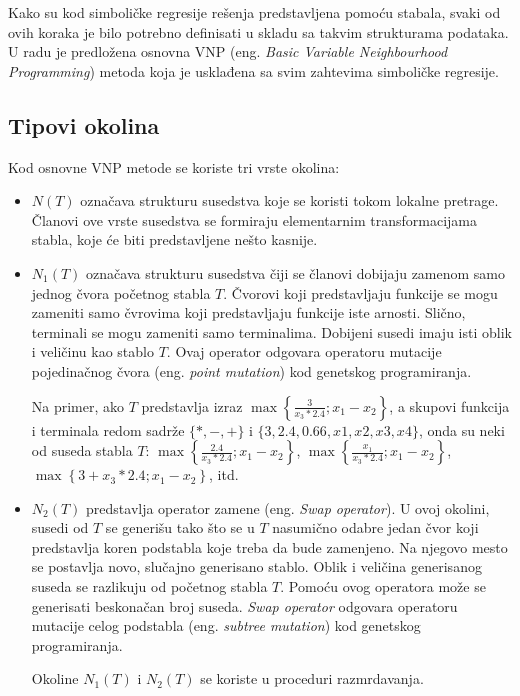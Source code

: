 \documentclass[main.tex]{subfiles}
\begin{document}
Kako su kod simboličke regresije rešenja predstavljena pomoću stabala, svaki od ovih koraka je bilo potrebno definisati u skladu sa takvim strukturama podataka. U radu \cite{vnp} je predložena osnovna VNP (eng. \textit{Basic Variable Neighbourhood Programming}) metoda koja je usklađena sa svim zahtevima simboličke regresije.


\subsection{Tipovi okolina}
\label{sec:neighbourhoodStructure}

Kod osnovne VNP metode se koriste tri vrste okolina:

\begin{itemize}
    \item $N(T)$ označava strukturu susedstva koje se koristi tokom lokalne pretrage. Članovi ove vrste susedstva se formiraju elementarnim transformacijama stabla, koje će biti predstavljene nešto kasnije. %
    
    \item $N_1(T)$ označava strukturu susedstva čiji se članovi dobijaju zamenom samo jednog čvora početnog stabla $T$. Čvorovi koji predstavljaju funkcije se mogu zameniti samo čvrovima koji predstavljaju funkcije iste arnosti. Slično, terminali se mogu zameniti samo terminalima. Dobijeni susedi imaju isti oblik i veličinu kao stablo $T$. Ovaj operator odgovara operatoru mutacije pojedinačnog čvora (eng. \textit{point mutation}) kod genetskog programiranja.
    
    Na primer, ako $T$ predstavlja izraz $ \max \left\{\frac{3}{x_{3} * 2.4} ; x_{1}-x_{2}\right\} $, a skupovi funkcija i terminala redom sadrže $\{*, -, +\}$ i $\{3, 2.4, 0.66, x1, x2, x3, x4\}$, onda su neki od suseda stabla $T$: $\max \left\{\frac{2.4}{x_{3} * 2.4} ; x_{1}-x_{2}\right\}$, $\max \left\{\frac{x_{1}}{x_{3} * 2.4} ; x_{1}-x_{2}\right\}$, $\max \left\{3 + x_{3} * 2.4 ; x_{1}-x_{2}\right\}$, itd.
    
    \item $N_2(T)$ predstavlja operator zamene (eng. \textit{Swap operator}). U ovoj okolini, susedi od $T$ se generišu tako što se u $T$ nasumično odabre jedan čvor koji predstavlja koren podstabla koje treba da bude zamenjeno. Na njegovo mesto se postavlja novo, slučajno generisano stablo. Oblik i veličina generisanog suseda se razlikuju od početnog stabla $T$. Pomoću ovog operatora može se generisati beskonačan broj suseda. \textit{Swap operator} odgovara operatoru mutacije celog podstabla (eng. \textit{subtree mutation}) kod genetskog programiranja.
    
    Okoline $N_1(T)$ i $N_2(T)$ se koriste u proceduri razmrdavanja.
\end{itemize}
\end{document}
